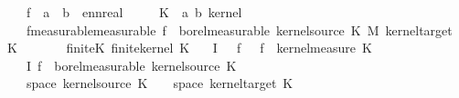 \begin{isabellebody}
{\ \ \ f\ {\isacharcolon}{\kern0pt}{\isacharcolon}{\kern0pt}\ {\isachardoublequoteopen}{\isacharprime}{\kern0pt}a\ {\isasymtimes}\ {\isacharprime}{\kern0pt}b\ {\isasymRightarrow}\ ennreal{\isachardoublequoteclose}\isanewline
\ \ \ \ \ K\ {\isacharcolon}{\kern0pt}{\isacharcolon}{\kern0pt}\ {\isachardoublequoteopen}{\isacharparenleft}{\kern0pt}{\isacharprime}{\kern0pt}a{\isacharcomma}{\kern0pt}\ {\isacharprime}{\kern0pt}b{\isacharparenright}{\kern0pt}\ kernel{\isachardoublequoteclose}\isanewline
\ \ \ f{\isacharunderscore}{\kern0pt}measurable{\isacharbrackleft}{\kern0pt}measurable{\isacharbrackright}{\kern0pt}{\isacharcolon}{\kern0pt}\ {\isachardoublequoteopen}f\ {\isasymin}\ borel{\isacharunderscore}{\kern0pt}measurable\ {\isacharparenleft}{\kern0pt}kernel{\isacharunderscore}{\kern0pt}source\ K\ {\isasymOtimes}\isactrlsub M\ kernel{\isacharunderscore}{\kern0pt}target\ K{\isacharparenright}{\kern0pt}{\isachardoublequoteclose}\isanewline
\ \ \ \ \ \ \ finite{\isacharunderscore}{\kern0pt}K{\isacharcolon}{\kern0pt}\ {\isachardoublequoteopen}finite{\isacharunderscore}{\kern0pt}kernel\ K{\isachardoublequoteclose}\isanewline
\ \ \ {\isachardoublequoteopen}I\ {\isasymequiv}\ {\isasymlambda}\ f{\isachardot}{\kern0pt}\ {\isacharparenleft}{\kern0pt}{\isasymlambda}{\isasymomega}\ {\isasymintegral}\isactrlsup {\isacharplus}{\kern0pt}{\isasymomega}\ f{\isacharparenleft}{\kern0pt}{\isasymomega}\ {\isasymomega}\ {\isasympartial}kernel{\isacharunderscore}{\kern0pt}measure\ K\ {\isasymomega}\isanewline
\ \ \ {\isachardoublequoteopen}I\ f\ {\isasymin}\ borel{\isacharunderscore}{\kern0pt}measurable\ {\isacharparenleft}{\kern0pt}kernel{\isacharunderscore}{\kern0pt}source\ K{\isacharparenright}{\kern0pt}{\isachardoublequoteclose}%
}%
%
\isadelimproof
%
\endisadelimproof
%
\isatagproof
{}\isamarkupfalse%
\ {\isacharminus}{\kern0pt}\isanewline
\ \ \isamarkupfalse%
\ {\isacharquery}{\kern0pt}{\isasymOmega}\ {\isacharequal}{\kern0pt}\ {\isachardoublequoteopen}space\ {\isacharparenleft}{\kern0pt}kernel{\isacharunderscore}{\kern0pt}source\ K{\isacharparenright}{\kern0pt}{\isachardoublequoteclose}\ \ {\isacharquery}{\kern0pt}{\isasymOmega}\ {\isacharequal}{\kern0pt}\ {\isachardoublequoteopen}space\ {\isacharparenleft}{\kern0pt}kernel{\isacharunderscore}{\kern0pt}target\ K{\isacharparenright}{\kern0pt}{\isachardoublequoteclose}\isanewline

\end{isabellebody}

